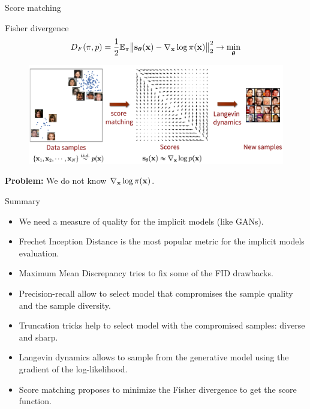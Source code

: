 \begin{frame}{Score matching}
	\begin{block}{Fisher divergence}
		\vspace{-0.3cm}
		\[
			D_F(\pi, p) = \frac{1}{2}\mathbb{E}_{\pi}\bigl\| \mathbf{s}_{\boldsymbol{\theta}}(\mathbf{x}) - \nabla_{\mathbf{x}} \log \pi(\mathbf{x}) \bigr\|^2_2 \rightarrow \min_{\boldsymbol{\theta}}
		\]
		\vspace{-0.5cm}
	\end{block}
	\begin{figure}
		\centering
		\includegraphics[width=\linewidth]{figs/smld}
	\end{figure} 
	\textbf{Problem:} We do not know $\nabla_{\mathbf{x}} \log \pi(\mathbf{x})$.
\end{frame}
\begin{frame}{Summary}
	\begin{itemize}
		\item We need a measure of quality for the implicit models (like GANs). 
		\vfill 
		\item Frechet Inception Distance is the most popular metric for the implicit models evaluation. 
		\vfill
		\item Maximum Mean Discrepancy tries to fix some of the FID drawbacks.
		\vfill
		\item Precision-recall allow to select model that compromises the sample quality and the sample diversity.	
		\vfill 
		\item Truncation tricks help to select model with the compromised samples: diverse and sharp.
		\vfill
		\item Langevin dynamics allows to sample from the generative model using the gradient of the log-likelihood.	
		\vfill
		\item Score matching proposes to minimize the Fisher divergence to get the score function.
	\end{itemize}
\end{frame}
 